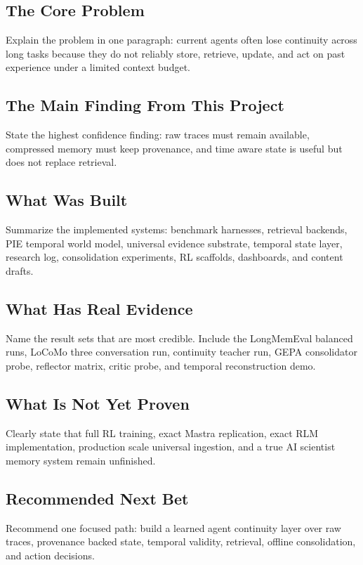 \documentclass[11pt]{article}
\begin{document}
\subsection{The Core Problem}
Explain the problem in one paragraph: current agents often lose continuity across long tasks because they do not reliably store, retrieve, update, and act on past experience under a limited context budget.

\subsection{The Main Finding From This Project}
State the highest confidence finding: raw traces must remain available, compressed memory must keep provenance, and time aware state is useful but does not replace retrieval.

\subsection{What Was Built}
Summarize the implemented systems: benchmark harnesses, retrieval backends, PIE temporal world model, universal evidence substrate, temporal state layer, research log, consolidation experiments, RL scaffolds, dashboards, and content drafts.

\subsection{What Has Real Evidence}
Name the result sets that are most credible. Include the LongMemEval balanced runs, LoCoMo three conversation run, continuity teacher run, GEPA consolidator probe, reflector matrix, critic probe, and temporal reconstruction demo.

\subsection{What Is Not Yet Proven}
Clearly state that full RL training, exact Mastra replication, exact RLM implementation, production scale universal ingestion, and a true AI scientist memory system remain unfinished.

\subsection{Recommended Next Bet}
Recommend one focused path: build a learned agent continuity layer over raw traces, provenance backed state, temporal validity, retrieval, offline consolidation, and action decisions.
\end{document}
